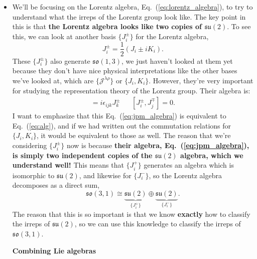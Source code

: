 \documentclass[12pt, oneside]{article}   	%
\theoremstyle{definition}
\begin{document}
\begin{itemize}

	\item We'll be focusing on the Lorentz algebra, Eq.~(\ref{eq:lorentz_algebra}), to try to understand what the irreps of the Lorentz group look like. The key point in this is that \textbf{the Lorentz algebra looks like two copies of $\mathfrak{su}(2)$}. To see this, we can look at another basis $\{J_i^\pm\}$ for the Lorentz algebra,
	\begin{equation}
		J_i^\pm = \frac{1}{2} \left(J_i\pm i K_i \right).
	\end{equation}
	These $\{J_i^\pm\}$ also generate $\mathfrak{so}(1, 3)$, we just haven't looked at them yet because they don't have nice physical interpretations like the other bases we've looked at, which are $\{\mathcal J^{\lambda\rho}\}$ or $\{J_i, K_i\}$. However, they're very important for studying the representation theory of the Lorentz group. Their algebra is:
	\begin{align}
		[J_i^\pm, J_j^\pm] = i\epsilon_{ijk} J_k^\pm && [J_i^\pm, J_j^\mp] = 0.\label{eq:jpm_algebra}
	\end{align}
	I want to emphasize that this Eq.~(\ref{eq:jpm_algebra}) is equivalent to Eq.~(\ref{eq:alg}), and if we had written out the commutation relations for $\{J_i, K_i\}$, it would be equivalent to those as well. The reason that we're considering $\{J_i^\pm\}$ now is because \textbf{their algebra, Eq.~(\ref{eq:jpm_algebra}), is simply two independent copies of the $\mathfrak{su}(2)$ algebra, which we understand well!} This means that $\{J_i^+\}$ generates an algebra which is isomorphic to $\mathfrak{su}(2)$, and likewise for $\{J_i^-\}$, so the Lorentz algebra decomposes as a direct sum,
	\begin{equation}
		\mathfrak{so}(3, 1)\cong \underbrace{\mathfrak{su}(2)}_{\{J_i^+\}}\oplus \underbrace{\mathfrak{su}(2)}_{\{J_i^-\}}.\label{eq:su31_decomp}
	\end{equation}
	The reason that this is so important is that we know \textbf{exactly} how to classify the irreps of $\mathfrak{su}(2)$, so we can use this knowledge to classify the irreps of $\mathfrak{so}(3, 1)$. 

\vspace{0.25cm}
\begin{answerbox}
	{\centering \textbf{Combining Lie algebras} } \\
	

\end{answerbox}
\end{itemize}
\end{document}

